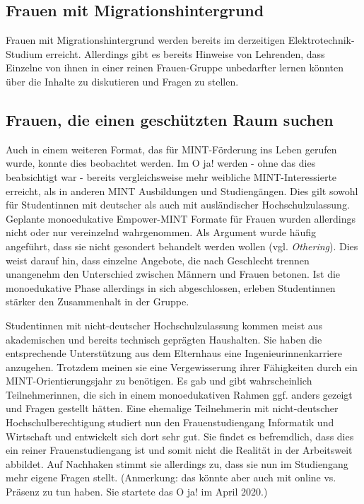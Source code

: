 \documentclass[a4paper, 12 pt]{IEEEtran}
\begin{document}
\subsection{Frauen mit Migrationshintergrund }
Frauen mit Migrationshintergrund werden bereits im derzeitigen Elektro\-tech\-nik-Studium erreicht. Allerdings gibt es bereits Hinweise von Lehrenden, dass Einzelne von ihnen in einer reinen Frauen-Gruppe unbedarfter lernen könnten über die Inhalte zu diskutieren und Fragen zu stellen. 

\subsection{Frauen, die einen geschützten Raum suchen}

Auch in einem weiteren Format, das für MINT-Förderung ins Leben gerufen wurde, konnte dies beobachtet werden. Im O ja! werden - ohne das dies beabsichtigt war - bereits vergleichsweise mehr weibliche MINT-Interessierte erreicht, als in anderen MINT Ausbildungen und Studiengängen. Dies gilt sowohl für Studentinnen mit deutscher als auch mit ausländischer Hochschulzulassung.
Geplante monoedukative Empower-MINT Formate für Frauen wurden allerdings nicht oder nur vereinzelnd wahrgenommen. Als Argument wurde häufig angeführt, dass sie nicht gesondert behandelt werden wollen (vgl. \emph{Othering}). Dies weist darauf hin, dass einzelne Angebote, die nach Geschlecht trennen unangenehm den Unterschied zwischen Männern und Frauen betonen. Ist die monoedukative Phase allerdings in sich abgeschlossen, erleben Studentinnen stärker den Zusammenhalt in der Gruppe.

Studentinnen mit nicht-deutscher Hochschulzulassung kommen meist aus akademischen und bereits technisch geprägten Haushalten. Sie haben die entsprechende Unterstützung aus dem Elternhaus eine Ingenieurinnenkarriere anzugehen. Trotzdem meinen sie eine Vergewisserung ihrer Fähigkeiten durch ein MINT-Orientierungsjahr zu benötigen.
Es gab und gibt wahrscheinlich Teilnehmerinnen, die sich in einem monoedukativen Rahmen ggf. anders gezeigt und Fragen gestellt hätten. Eine ehemalige Teilnehmerin mit nicht-deutscher Hochschulberechtigung studiert nun den Frauenstudiengang Informatik und Wirtschaft und entwickelt sich dort sehr gut. Sie findet es befremdlich, dass dies ein reiner Frauenstudiengang ist und somit nicht die Realität in der Arbeitsweit abbildet. Auf Nachhaken stimmt sie allerdings zu, dass sie nun im Studiengang mehr eigene Fragen stellt. (Anmerkung: das könnte aber auch mit online vs. Präsenz zu tun haben. Sie startete das O ja! im April 2020.)
\end{document}

